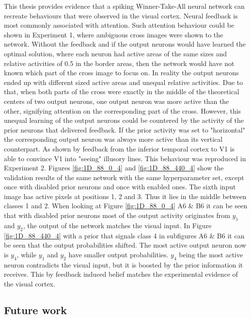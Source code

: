 This thesis provides evidence that a spiking Winner-Take-All neural network can recreate behaviours that were observed in the visual cortex. Neural feedback is most commonly associated with attention. Such attention behaviour could be shown in Experiment 1, where ambiguous cross images were shown to the network. Without the feedback and if the output neurons would have learned the optimal solution, where each neuron had active areas of the same sizes and relative activities of 0.5 in the border areas, then the network would have not known which part of the cross image to focus on. In reality the output neurons ended up with different sized active areas and unequal relative activities. Due to that, when both parts of the cross were exactly in the middle of the theoretical centers of two output neurons, one output neuron was more active than the other, signifying attention on the corresponding part of the cross. However, this unequal learning of the output neurons could be countered by the activity of the prior neurons that delivered feedback. If the prior activity was set to "horizontal" the corresponding output neuron was always more active than its vertical counterpart. As shown by \citet{HierachicalBayesVisualCortex} feedback from the inferior temporal cortex to V1 is able to convince V1 into "seeing" illusory lines. This behaviour was reproduced in Experiment 2. Figures \ref{fig:1D_88_0_4} and \ref{fig:1D_88_440_4} show the validation results of the same network with the same hyperparameter set, except once with disabled prior neurons and once with enabled ones. The sixth input image has active pixels at positions 1, 2 and 3. Thus it lies in the middle between classes 1 and 2. When looking at Figure \ref{fig:1D_88_0_4} A6 & B6 it can be seen that with disabled prior neurons most of the output activity originates from $y_1$ and $y_2$, the output of the network  matches the visual input. In Figure \ref{fig:1D_88_440_4} with a prior that signals class 4 in subfigures A6 & B6 it can be seen that the output probabilities shifted. The most active output neuron now is $y_4$, while $y_1$ and $y_2$ have smaller output probabilities. $y_4$ being the most active neuron contradicts the visual input, but it is boosted by the prior information it receives. This by feedback induced belief matches the experimental evidence of the visual cortex.





\subsection{Future work}


